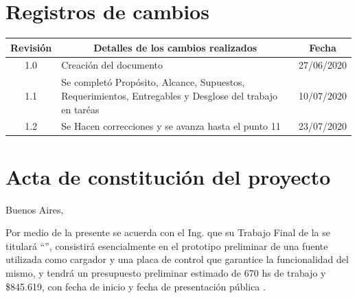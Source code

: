 \documentclass[11pt]{charter}
\begin{document}
\maketitle
\thispagestyle{empty}
\pagebreak


\thispagestyle{empty}
{\setlength{\parskip}{0pt}
\tableofcontents{}
}
\pagebreak


\section{Registros de cambios}
\label{sec:registro}


\begin{table}[ht]
\label{tab:registro}
\centering

\begin{tabularx}{\linewidth}{@{}|c|X|c|@{}}
\hline
\rowcolor[HTML]{C0C0C0} 
Revisión & \multicolumn{1}{c|}{\cellcolor[HTML]{C0C0C0}Detalles de los cambios realizados} & Fecha      \\ \hline
1.0      & Creación del documento                                                          & 27/06/2020 \\ \hline
1.1      & Se completó Propósito, Alcance, Supuestos, Requerimientos, Entregables y Desglose del trabajo en taréas 																						   & 10/07/2020 \\ \hline
1.2      & Se Hacen correcciones y se avanza hasta el punto 11 %
& 23/07/2020 \\ \hline
\end{tabularx}
\end{table}

\pagebreak



\section{Acta de constitución del proyecto}
\label{sec:acta}

\begin{flushright}
Buenos Aires, \fechaInicioName
\end{flushright}

\vspace{2cm}

Por medio de la presente se acuerda con el Ing. \authorname\hspace{1px} que su Trabajo Final de la \degreename\hspace{1px} se titulará ``\ttitle'', consistirá esencialmente en el prototipo preliminar de una fuente utilizada como cargador y una placa de control que garantice la funcionalidad del mismo, y tendrá un presupuesto preliminar estimado de 670 hs de trabajo y {\$845.619}, con fecha de inicio \fechaInicioName\hspace{1px} y fecha de presentación pública \fechaFinalName.
\end{document}
